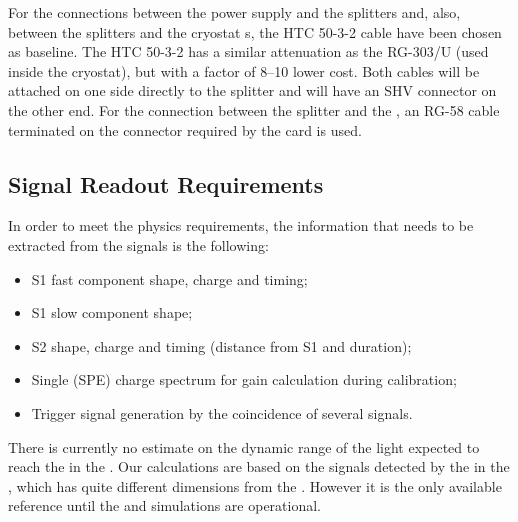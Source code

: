 For the connections between the  power supply and the splitters and, also, between the splitters and the cryostat \fdth{}s, the HTC 50-3-2 cable have been chosen as baseline. The HTC 50-3-2 has a similar attenuation %
as the RG-303/U (used inside the cryostat), but with a factor of \numrange{8}{10} lower cost. Both cables will be attached on one side directly to the  splitter and will have an SHV connector on the other end. For the connection between the splitter and the , an RG-58 cable %
terminated on the connector required by the  card is used.

\subsection{Signal Readout Requirements}
\label{sec:fddp-pd-4.3}

In order to meet the physics requirements, the information that needs to be extracted from the  signals is the following:

\begin{itemize}
\item S1 fast component shape, charge and timing;
\item S1 slow component shape;
\item S2 shape, charge and timing (distance from S1 and duration);
\item Single \phel (SPE) charge spectrum for gain calculation during  calibration;
\item Trigger signal generation by the coincidence of several  signals.
\end{itemize}

There is currently no estimate on the dynamic range of the light expected to reach the  in the . Our calculations are based on the signals detected by the  in the , %
which has quite different dimensions from the . However it is the only available reference %
until the  and simulations are operational.

